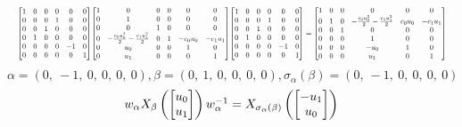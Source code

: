 \documentclass[11pt]{article}
\theoremstyle{definition}
\begin{document}
\[
\scaletoalign{\textwidth}{{\left[\begin{matrix}1 & 0 & 0 & 0 & 0 & 0\\0 & 0 & 0 & 1 & 0 & 0\\0 & 0 & 1 & 0 & 0 & 0\\0 & 1 & 0 & 0 & 0 & 0\\0 & 0 & 0 & 0 & -1 & 0\\0 & 0 & 0 & 0 & 0 & 1\end{matrix}\right]} {\left[\begin{matrix}1 & 0 & 0 & 0 & 0 & 0\\0 & 1 & 0 & 0 & 0 & 0\\0 & 0 & 1 & 0 & 0 & 0\\0 & - \frac{c_{0} u_{0}^{2}}{2} - \frac{c_{1} u_{1}^{2}}{2} & 0 & 1 & - c_{0} u_{0} & - c_{1} u_{1}\\0 & u_{0} & 0 & 0 & 1 & 0\\0 & u_{1} & 0 & 0 & 0 & 1\end{matrix}\right]} {\left[\begin{matrix}1 & 0 & 0 & 0 & 0 & 0\\0 & 0 & 0 & 1 & 0 & 0\\0 & 0 & 1 & 0 & 0 & 0\\0 & 1 & 0 & 0 & 0 & 0\\0 & 0 & 0 & 0 & -1 & 0\\0 & 0 & 0 & 0 & 0 & 1\end{matrix}\right]} = {\left[\begin{matrix}1 & 0 & 0 & 0 & 0 & 0\\0 & 1 & 0 & - \frac{c_{0} u_{0}^{2}}{2} - \frac{c_{1} u_{1}^{2}}{2} & c_{0} u_{0} & - c_{1} u_{1}\\0 & 0 & 1 & 0 & 0 & 0\\0 & 0 & 0 & 1 & 0 & 0\\0 & 0 & 0 & - u_{0} & 1 & 0\\0 & 0 & 0 & u_{1} & 0 & 1\end{matrix}\right]}}
\]
\[
\alpha = \left( 0, \  -1, \  0, \  0, \  0, \  0\right), \beta = \left( 0, \  1, \  0, \  0, \  0, \  0\right), \sigma_{\alpha}(\beta) = \left( 0, \  -1, \  0, \  0, \  0, \  0\right)
\]
\[
\scaletoalign{\textwidth}{w_{\alpha} X_{\beta}\left(\left[\begin{matrix}u_{0}\\u_{1}\end{matrix}\right]\right) w_{\alpha}^{-1} = X_{\sigma_{\alpha}\left(\beta\right)}\left(\left[\begin{matrix}- u_{1}\\u_{0}\end{matrix}\right]\right)}
\]
\end{document}
